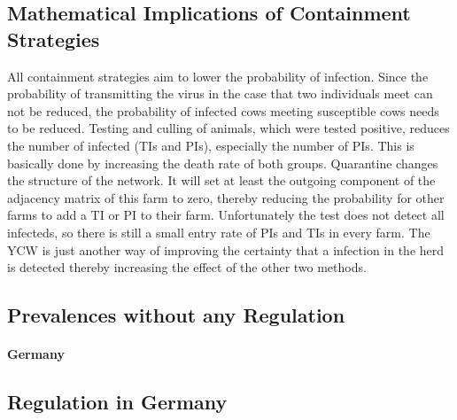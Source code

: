 \subsection{Mathematical Implications of Containment Strategies}
All containment strategies aim to lower the probability of infection. Since the probability of transmitting the virus in the case that two individuals meet can not be reduced, the probability of infected cows meeting susceptible cows needs to be reduced. 
Testing and culling of animals, which were tested positive, reduces the number of infected (TIs and PIs), especially the number of PIs. This is basically done by increasing the death rate of both groups. 
Quarantine changes the structure of the network. It will set at least the outgoing component of the adjacency matrix of this farm to zero, thereby reducing the probability for other farms to add a TI or PI to their farm. Unfortunately the test does not detect all infecteds, so there is still a small entry rate of PIs and TIs in every farm.
The YCW is just another way of improving the certainty that a infection in the herd is detected thereby increasing the effect of the other two methods.
\subsection{Prevalences without any Regulation}

\paragraph{Germany}
\subsection{Regulation in Germany}\label{chap:rlDataRegulationGermany}
